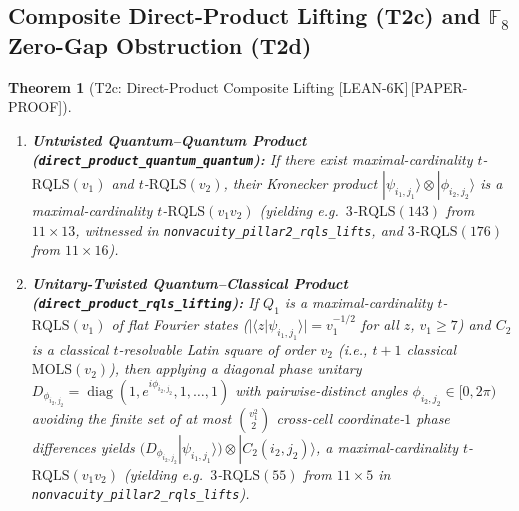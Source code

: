 \documentclass[11pt,reqno]{amsart}
\newtheorem{theorem}{Theorem}[section]
\theoremstyle{definition}
\newcommand{\FF}{\mathbb{F}}
\newcommand{\RQLS}{\mathrm{RQLS}}
\newcommand{\MOLS}{\mathrm{MOLS}}
\newcommand{\lid}[1]{{\footnotesize\nolinkurl{#1}}}
\newcommand{\tagL}{\textsf{\footnotesize[LEAN-6K]}}
\newcommand{\tagP}{\textsf{\footnotesize[PAPER-PROOF]}}
\begin{document}
\subsection{Composite Direct-Product Lifting (T2c) and \texorpdfstring{$\FF_8$}{F\_8} Zero-Gap Obstruction (T2d)}

\begin{theorem}[T2c: Direct-Product Composite Lifting \tagL\,\tagP]
\label{thm:t2c}
\leavevmode
\begin{enumerate}[label=(\alph*)]
  \item \textbf{Untwisted Quantum--Quantum Product (\lid{direct_product_quantum_quantum}):}
    If there exist maximal-cardinality $t$-$\RQLS(v_1)$ and $t$-$\RQLS(v_2)$, their
    Kronecker product $|\psi_{i_1,j_1}\rangle \otimes |\phi_{i_2,j_2}\rangle$ is a
    maximal-cardinality $t$-$\RQLS(v_1 v_2)$ (yielding e.g.\ $3$-$\RQLS(143)$ from
    $11 \times 13$, witnessed in \lid{nonvacuity_pillar2_rqls_lifts}, and
    $3$-$\RQLS(176)$ from $11 \times 16$).
  \item \textbf{Unitary-Twisted Quantum--Classical Product (\lid{direct_product_rqls_lifting}):}
    If $Q_1$ is a maximal-cardinality $t$-$\RQLS(v_1)$ of flat Fourier states
    ($|\langle z | \psi_{i_1,j_1} \rangle| = v_1^{-1/2}$ for all $z$, $v_1 \ge 7$) and
    $C_2$ is a classical $t$-resolvable Latin square of order $v_2$ (i.e., $t+1$ classical
    $\MOLS(v_2)$), then applying a diagonal phase unitary $D_{\phi_{i_2,j_2}} =
    \operatorname{diag}(1, e^{i\phi_{i_2,j_2}}, 1, \dots, 1)$ with pairwise-distinct
    angles $\phi_{i_2,j_2} \in [0, 2\pi)$ avoiding the finite set of at most
    $\binom{v_1^2}{2}$ cross-cell coordinate-$1$ phase differences yields
    $(D_{\phi_{i_2,j_2}} |\psi_{i_1,j_1}\rangle) \otimes |C_2(i_2,j_2)\rangle$, a
    maximal-cardinality $t$-$\RQLS(v_1 v_2)$ (yielding e.g.\ $3$-$\RQLS(55)$ from
    $11 \times 5$ in \lid{nonvacuity_pillar2_rqls_lifts}).
\end{enumerate}
\end{theorem}
\end{document}
